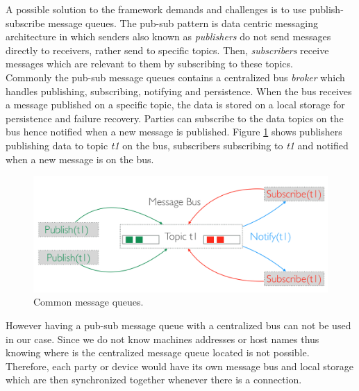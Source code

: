  

\noindent A possible solution to the framework demands and challenges is to use publish-subscribe message queues. The pub-sub pattern is data centric messaging architecture in which senders also known as \textit{publishers} do not send messages directly to receivers, rather send to specific topics. Then, \textit{subscribers} receive messages which are relevant to them by subscribing to these topics. \\


\noindent Commonly the pub-sub message queues contains a centralized bus \textit{broker} which handles publishing, subscribing, notifying and persistence. 
When the bus receives a message published on a specific topic, the data is stored on a local storage for persistence and failure recovery. 
Parties can subscribe to the data topics on the  bus hence notified when a new message is published. Figure \ref{fig:message-queues} shows  publishers publishing data to topic \textit{t1} on the bus, subscribers subscribing to \textit{t1} and notified when a new message is on the bus.
	
\begin{figure}[H]
	\centering
	\includegraphics[scale=0.3]{images/message-queues.png}
	\caption{Common message queues.}
	\label{fig:message-queues}
\end{figure}

\noindent However having a pub-sub message queue with a centralized bus can not be used in our case. Since we do not know machines addresses or host names thus knowing where is the centralized message queue located is not possible. Therefore, each party or device would have its own message bus and local storage which are then synchronized together whenever there is a connection.

